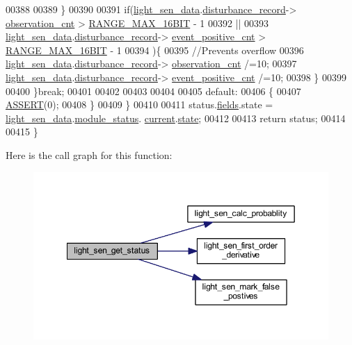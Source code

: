 \begin{DoxyCode}
00388 
00389              \}
00390 
00391              \textcolor{keywordflow}{if}(\hyperlink{a00047_a53c98c9f84d5cecf0747bbe1f6b83696}{light\_sen\_data}.\hyperlink{a00024_ac9b38e2c1d3f1013a88d33506c754152}{disturbance\_record}->
      \hyperlink{a00028_ad5b0bac02ce266b91b2b52a1c3ea1d78}{observation\_cnt} > \hyperlink{a00021_ae01726ef8ba0a9e1fe8655dc382ecda8}{RANGE\_MAX\_16BIT} - 1
00392                 ||
00393                 \hyperlink{a00047_a53c98c9f84d5cecf0747bbe1f6b83696}{light\_sen\_data}.\hyperlink{a00024_ac9b38e2c1d3f1013a88d33506c754152}{disturbance\_record}->
      \hyperlink{a00028_a7397b9d76d4b57500f27bb23d258a18a}{event\_positive\_cnt} > \hyperlink{a00021_ae01726ef8ba0a9e1fe8655dc382ecda8}{RANGE\_MAX\_16BIT} - 1
00394                 )\{
00395              \textcolor{comment}{//Prevents overflow}
00396               \hyperlink{a00047_a53c98c9f84d5cecf0747bbe1f6b83696}{light\_sen\_data}.\hyperlink{a00024_ac9b38e2c1d3f1013a88d33506c754152}{disturbance\_record}->
      \hyperlink{a00028_ad5b0bac02ce266b91b2b52a1c3ea1d78}{observation\_cnt}    /=10;
00397               \hyperlink{a00047_a53c98c9f84d5cecf0747bbe1f6b83696}{light\_sen\_data}.\hyperlink{a00024_ac9b38e2c1d3f1013a88d33506c754152}{disturbance\_record}->
      \hyperlink{a00028_a7397b9d76d4b57500f27bb23d258a18a}{event\_positive\_cnt} /=10;
00398              \}
00399 
00400         \}\textcolor{keywordflow}{break};
00401 
00402 
00403 
00404 
00405         \textcolor{keywordflow}{default}:
00406         \{
00407             \hyperlink{a00072_abb8ff8e213ac9f6fb21d2b968583b936}{ASSERT}(0);
00408         \}
00409     \}
00410 
00411   status.\hyperlink{a00021_a5296d090c085b0421fdf5a86e382abea}{fields}.state = \hyperlink{a00047_a53c98c9f84d5cecf0747bbe1f6b83696}{light\_sen\_data}.\hyperlink{a00024_a5a53c391562b059eb744ac679f3765ca}{module\_status}.
      \hyperlink{a00017_ab8af48cdbba92b3ae39c4470e53af944}{current}.\hyperlink{a00017_a6b8d8e916bc56265a3fd279bd26b6d1b}{state};
00412 
00413   \textcolor{keywordflow}{return} status;
00414 
00415 \}
\end{DoxyCode}


Here is the call graph for this function\+:\nopagebreak
\begin{figure}[H]
\begin{center}
\leavevmode
\includegraphics[width=349pt]{d6/d2d/a00047_a8ae9d26a7404094bcd7cbef5ed40da75_cgraph}
\end{center}
\end{figure}


